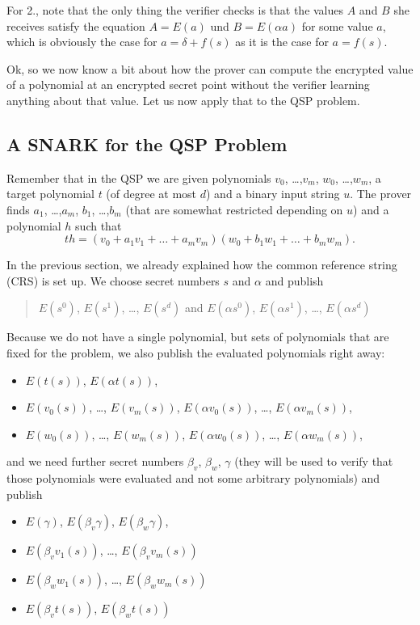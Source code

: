 \documentclass[11pt,letterpaper]{article}
\begin{document}
For 2., note that the only thing the verifier checks is that the values $A$ and $B$ she receives satisfy the equation $A = E(a)$ und $B = E(\alpha  a)$ for some value $a$, which is obviously the case for $a = \delta  + f(s)$ as it is the case for $a = f(s)$.


Ok, so we now know a bit about how the prover can compute the encrypted value of a polynomial at an encrypted secret point without the verifier learning anything about that value. Let us now apply that to the QSP problem.

\subsection{A SNARK for the QSP Problem}


Remember that in the QSP we are given polynomials $v_{0}$, \dots,$v_{m}$, $w_{0}$, \dots,$w_{m}$, a target polynomial $t$ (of degree at most $d$) and a binary input string $u$. The prover finds $a_{1}$, \dots,$a_{m}$, $b_{1}$, \dots,$b_{m}$ (that are somewhat restricted depending on $u$) and a polynomial $h$ such that
\[
t h = (v_{0} + a_{1}v_{1} +  \dots  + a_{m}v_{m}) (w_{0} + b_{1}w_{1} +  \dots  + b_{m}w_{m}).
\]


In the previous section, we already explained how the common reference string (CRS) is set up. We choose secret numbers $s$ and $\alpha$  and publish
\begin{quote}
$E(s^{0})$, $E(s^{1})$,  \dots, $E(s^{d})$ \quad and \quad $E(\alpha s^{0})$, $E(\alpha s^{1})$,  \dots, $E(\alpha s^{d})$
\end{quote}

Because we do not have a single polynomial, but sets of polynomials that are fixed for the problem, we also publish the evaluated polynomials right away:
\begin{itemize}
\item $E(t(s))$, $E(\alpha  t(s))$,
\item $E(v_{0}(s))$,  \dots, $E(v_{m}(s))$, $E(\alpha  v_{0}(s))$,  \dots, $E(\alpha  v_{m}(s))$,
\item $E(w_{0}(s))$,  \dots, $E(w_{m}(s))$, $E(\alpha  w_{0}(s))$,  \dots, $E(\alpha  w_{m}(s))$,
\end{itemize}


and we need further secret numbers $\beta _{v}$, $\beta _{w}$, $\gamma$  (they will be used to verify that those polynomials were evaluated and not some arbitrary polynomials) and publish
\begin{itemize}
\item $E(\gamma )$, $E(\beta _{v} \gamma )$, $E(\beta _{w} \gamma )$,
\item $E(\beta _{v} v_{1}(s))$,  \dots, $E(\beta _{v} v_{m}(s))$
\item $E(\beta _{w} w_{1}(s))$,  \dots, $E(\beta _{w} w_{m}(s))$
\item $E(\beta _{v} t(s))$, $E(\beta _{w} t(s))$
\end{itemize}
\end{document}
